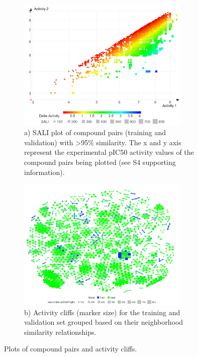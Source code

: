 \begin{figure}
\centering
\begin{subfigure}
  \centering
  \includegraphics[width=0.9\textwidth]{Images/bace_fig2A.png}
  \caption{a) SALI plot of compound pairs (training and validation) with >95\% similarity.  The x and y axis represent the experimental pIC50 activity values of the compound pairs being plotted (see S4 supporting information).}
  \label{fig:bace_2A}
\end{subfigure}
\begin{subfigure}
  \centering
  \includegraphics[width=0.9\textwidth]{Images/bace_fig2B.png}
  \caption{b) Activity cliffs (marker size) for the training and validation set grouped based on their neighborhood similarity relationships.}
  \label{fig:bace_2B}
\end{subfigure}
\caption{Plots of compound pairs and activity cliffs.}
\label{fig:bace_2}
\end{figure}

